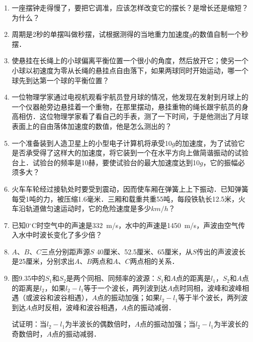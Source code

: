 \newpage
\begin{exercises}
\begin{enumerate}
    \item 一座摆钟走得慢了，要把它调准，应该怎样改变它的摆长？是增长还是缩短？为什么？
    \item 周期是2秒的单摆叫做秒摆，试根据测得的当地重力加速度$g$的数值自制一个秒摆．
    \item 使悬挂在长绳上的小球偏离平衡位置一个很小的角度，然后放开它；使另一个小球以初速度为零从长绳的悬挂点自由落下，如果两球同时开始运动，哪一个球先到达第一个球的平衡位置？
    \item 一位物理学家通过电视机观看宇航员登月球的情况，他发现在发射到月球上的一个仪器舱旁边悬挂着一个重物，在那里摆动，悬挂重物的绳长跟宇航员的身高相仿．这位物理学家看了看自己的手表，测了一下时间，于是他测出了月球表面上的自由落体加速度的数值，他是怎么测出的？
    \item 一个准备装到人造卫星上的小型电子计算机将承受10$g$的加速度，为了试验它是否承受得了这样大的加速度，将它装到一个在水平方向上做简谐振动的试验台上．试验台的频率是10赫，要使试验台的最大加速度达到10$g$，它的振幅必须多大？
    \item 火车车轮经过接轨处时要受到震动，因而使车厢在弹簧上上下振动．已知弹簧每受1吨的力，被压缩1.6毫米．三厢和载重共重55吨，每段铁轨长12.5米，火车沿轨道做匀速运动时，它的危险速度是多少$\si{km/h}$？
    \item 已知0$^{\circ}$C时空气中的声速是\qty{332}{m/s}，水中的声速是\qty{1450}{m/s}，声波由空气传入水中时波长变化了多少倍？
    \item $A$、$B$、$C$三点分别距声源$S$ 40厘米、52.5厘米、65厘米，从$S$传出的声波波长是25厘米，分别求出$A$、$B$两点和$A$、$C$两点相的关系．
    \item 图9.35中的$S_1$和$S_2$是两个同相、同频率的波源：$S_1$和$A$点的距离是$l_1$，$S_2$和$A$点的距离是$l_2$，如果$l_2-l_1$等于一个波长，两列波到达$A$点时同相，波峰和波峰相遇（或波谷和波谷相遇），$A$点的振动加强；如果$l_2-l_1$等于半个波长，两列波到达$A$点时反相，波峰和波谷相遇，$A$点的振动减弱．

          试证明：当$l_2-l_1$为半波长的偶数倍时，$A$点的振动加强；当$l_2-l_1$为半波长的奇数倍时，$A$点的振动减弱．
          \begin{figure}[H]\centering
              \caption{}
          \end{figure}
\end{enumerate}
\end{exercises}
